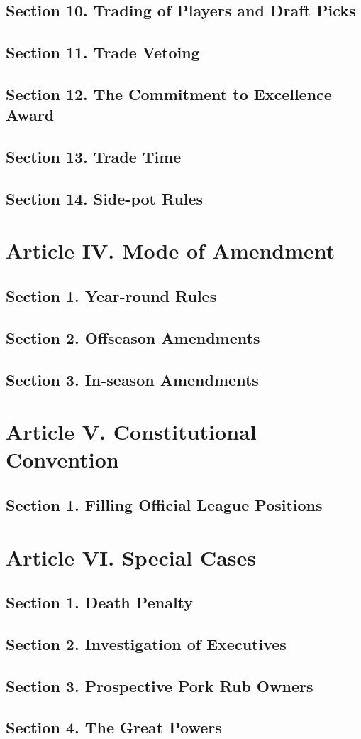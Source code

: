\documentclass{article}
\begin{document}
	\subsection*{Section 10. Trading of Players and Draft Picks}
	\subsection*{Section 11. Trade Vetoing}
	\subsection*{Section 12. The Commitment to Excellence Award}
	\subsection*{Section 13. Trade Time}
	\subsection*{Section 14. Side-pot Rules}

\section{Article IV. Mode of Amendment}
	\subsection*{Section 1. Year-round Rules}
	\subsection*{Section 2. Offseason Amendments}
	\subsection*{Section 3. In-season Amendments}

\section{Article V. Constitutional Convention}
	\subsection*{Section 1. Filling Official League Positions}

\section{Article VI. Special Cases}
	\subsection*{Section 1. Death Penalty}
    \subsection*{Section 2. Investigation of Executives}
    \subsection*{Section 3. Prospective Pork Rub Owners}
    \subsection*{Section 4. The Great Powers}
\end{document}
